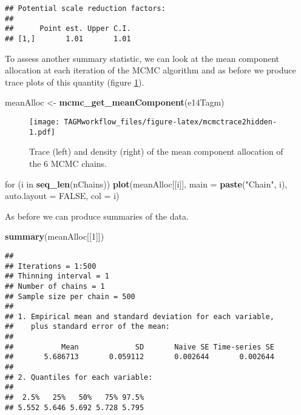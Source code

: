 \documentclass[]{article}
\newenvironment{Shaded}{\begin{snugshade}}{\end{snugshade}}
\newcommand{\KeywordTok}[1]{\textcolor[rgb]{0.13,0.29,0.53}{\textbf{{#1}}}}
\newcommand{\DataTypeTok}[1]{\textcolor[rgb]{0.13,0.29,0.53}{{#1}}}
\newcommand{\DecValTok}[1]{\textcolor[rgb]{0.00,0.00,0.81}{{#1}}}
\newcommand{\StringTok}[1]{\textcolor[rgb]{0.31,0.60,0.02}{{#1}}}
\newcommand{\OtherTok}[1]{\textcolor[rgb]{0.56,0.35,0.01}{{#1}}}
\newcommand{\NormalTok}[1]{{#1}}
\begin{document}
\begin{verbatim}
## Potential scale reduction factors:
## 
##      Point est. Upper C.I.
## [1,]       1.01       1.01
\end{verbatim}

To assess another summary statistic, we can look at the mean component
allocation at each iteration of the MCMC algorithm and as before we
produce trace plots of this quantity (figure
\ref{fig:mcmctrace2hidden}).

\begin{Shaded}
\begin{Highlighting}[]
\NormalTok{meanAlloc <-}\StringTok{ }\KeywordTok{mcmc_get_meanComponent}\NormalTok{(e14Tagm)}
\end{Highlighting}
\end{Shaded}

\begin{figure}[htbp]
\centering
\texttt{[image: TAGMworkflow\_files/figure-latex/mcmctrace2hidden-1.pdf]}
\caption{\label{fig:mcmctrace2hidden}Trace (left) and density (right) of the
mean component allocation of the 6 MCMC chains.}
\end{figure}

\begin{Shaded}
\begin{Highlighting}[]
\NormalTok{for (i in }\KeywordTok{seq_len}\NormalTok{(nChains))}
    \KeywordTok{plot}\NormalTok{(meanAlloc[[i]], }\DataTypeTok{main =} \KeywordTok{paste}\NormalTok{(}\StringTok{"Chain"}\NormalTok{, i), }\DataTypeTok{auto.layout =} \OtherTok{FALSE}\NormalTok{, }\DataTypeTok{col =} \NormalTok{i)}
\end{Highlighting}
\end{Shaded}

As before we can produce summaries of the data.

\begin{Shaded}
\begin{Highlighting}[]
\KeywordTok{summary}\NormalTok{(meanAlloc[[}\DecValTok{1}\NormalTok{]])}
\end{Highlighting}
\end{Shaded}

\begin{verbatim}
## 
## Iterations = 1:500
## Thinning interval = 1 
## Number of chains = 1 
## Sample size per chain = 500 
## 
## 1. Empirical mean and standard deviation for each variable,
##    plus standard error of the mean:
## 
##           Mean             SD       Naive SE Time-series SE 
##       5.686713       0.059112       0.002644       0.002644 
## 
## 2. Quantiles for each variable:
## 
##  2.5%   25%   50%   75% 97.5% 
## 5.552 5.646 5.692 5.728 5.795
\end{verbatim}
\end{document}
